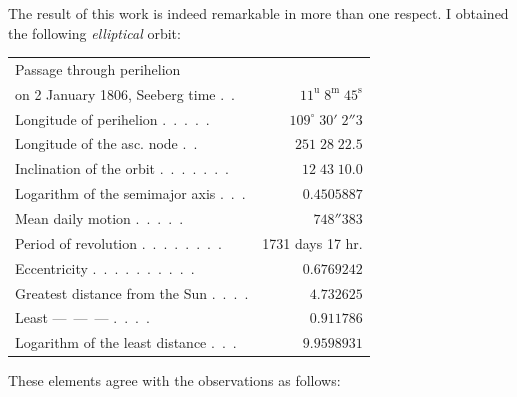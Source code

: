 \par\indent The result of this work is indeed remarkable in more than one respect. I obtained the following \emph{elliptical} orbit:

\begin{center}\begingroup
\fontsize{9}{11}\selectfont
\setlength{\tabcolsep}{2pt}\renewcommand{\arraystretch}{1.12}
\begin{tabular}{lr}
\multicolumn{2}{l}{Passage through perihelion} \\
\quad on 2 January 1806, Seeberg time .\ . & $11^{\mathrm{u}}\;8^{\mathrm{m}}\;45^{\mathrm{s}}$ \\
Longitude of perihelion .\ .\ .\ .\ . & $109^\circ\;30'\;2''3$ \\
Longitude of the asc. node .\ . & $251\;28\;22.5$ \\
Inclination of the orbit .\ .\ .\ .\ .\ .\ . & $12\;43\;10.0$ \\
Logarithm of the semimajor axis .\ .\ . & $0.4505887$ \\
Mean daily motion .\ .\ .\ .\ . & $748''383$ \\
Period of revolution .\ .\ .\ .\ .\ .\ .\ . & 1731 days 17 hr. \\
Eccentricity .\ .\ .\ .\ .\ .\ .\ .\ .\ . & $0.6769242$ \\
Greatest distance from the Sun .\ .\ .\ . & $4.732625$ \\
Least \quad---\ ---\ --- .\ .\ .\ . & $0.911786$ \\
Logarithm of the least distance .\ .\ . & $9.9598931$ \\
\end{tabular}\endgroup\end{center}

\par\indent These elements agree with the observations as follows:

